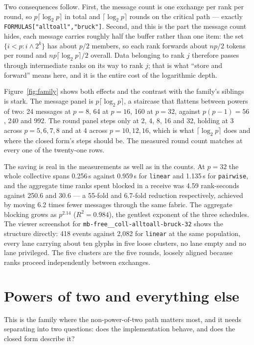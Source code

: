 \documentclass[11pt]{article}
\begin{document}
Two consequences follow. First, the message count is one exchange per rank per round, so
$p\lceil\log_2 p\rceil$ in total and $\lceil\log_2 p\rceil$ rounds on the critical path ---
exactly \texttt{FORMULAS["alltoall","bruck"]}. Second, and this is the part the message count
hides, each message carries roughly half the buffer rather than one item: the set
$\{i < p : i \wedge 2^k\}$ has about $p/2$ members, so each rank forwards about $np/2$ tokens
per round and $np\lceil\log_2 p\rceil/2$ overall. Data belonging to rank $j$ therefore passes
through intermediate ranks on its way to rank $j$; that is what ``store and forward'' means
here, and it is the entire cost of the logarithmic depth.

Figure~\ref{fig:family} shows both effects and the contrast with the family's siblings is
stark. The message panel is $p\lceil\log_2 p\rceil$, a staircase that flattens between powers
of two: 24 messages at $p=8$, 64 at $p=16$, 160 at $p=32$, against $p(p-1) = 56$, 240 and 992.
The round panel steps only at 2, 4, 8, 16 and 32, holding at 3 across $p = 5,6,7,8$ and at 4
across $p = 10,12,16$, which is what $\lceil\log_2 p\rceil$ does and where the closed form's
steps should be. The measured round count matches at every one of the twenty-one rows.

The saving is real in the measurements as well as in the counts. At $p=32$ the whole collective
spans 0.256\,s against 0.959\,s for \texttt{linear} and 1.135\,s for \texttt{pairwise}, and the
aggregate time ranks spent blocked in a receive was 4.59 rank-seconds against 250.6 and 30.6 ---
a 55-fold and 6.7-fold reduction respectively, achieved by moving 6.2 times fewer messages
through the same fabric. The aggregate blocking grows as $p^{2.14}$ ($R^2 = 0.984$), the
gentlest exponent of the three schedules. The viewer screenshot for
\texttt{mb-free\_\_coll-alltoall-bruck-32} shows the structure directly: 418 events against
2,082 for \texttt{linear} at the same population, every lane carrying about ten glyphs in five
loose clusters, no lane empty and no lane privileged. The five clusters are the five rounds,
loosely aligned because ranks proceed independently between exchanges.

\section{Powers of two and everything else}

This is the family where the non-power-of-two path matters most, and it needs separating into
two questions: does the implementation behave, and does the closed form describe it?
\end{document}
